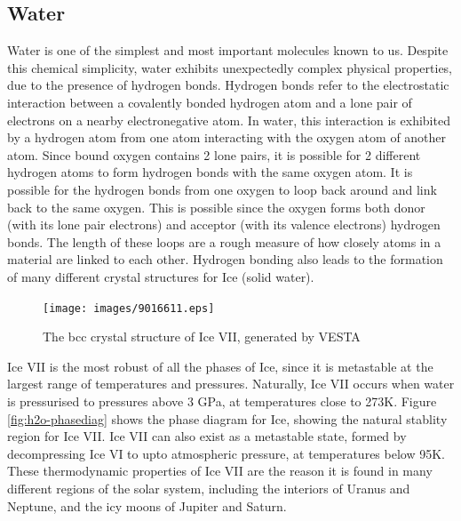 \documentclass[a4paper,11pt]{article}
\begin{document}
\subsection{Water}
Water is one of the simplest and most important molecules known to us. Despite this chemical simplicity, water exhibits unexpectedly complex physical properties, due to the presence of hydrogen bonds. Hydrogen bonds refer to the electrostatic interaction between a covalently bonded hydrogen atom and a lone pair of electrons on a nearby electronegative atom. In water, this interaction is exhibited by a hydrogen atom from one atom interacting with the oxygen atom of another atom. Since bound oxygen contains 2 lone pairs, it is possible for 2 different hydrogen atoms to form hydrogen bonds with the same oxygen atom. It is possible for the hydrogen bonds from one oxygen to loop back around and link back to the same oxygen. This is possible since the oxygen forms both donor (with its lone pair electrons) and acceptor (with its valence electrons) hydrogen bonds. The length of these loops are a rough measure of how closely atoms in a material are linked to each other. Hydrogen bonding also leads to the formation of many different crystal structures for Ice (solid water).
\begin{figure}[H]
  \centering
  \texttt{[image: images/9016611.eps]}
  \caption{The bcc crystal structure of Ice VII, generated by VESTA}
  \label{fig:icevii-bcc}
\end{figure}
Ice VII is the most robust of all the phases of Ice, since it is metastable at the largest range of temperatures and pressures. Naturally, Ice VII occurs when water is pressurised to pressures above 3 GPa, at temperatures close to 273K. Figure \ref{fig:h2o-phasediag} shows the phase diagram for Ice, showing the natural stablity region for Ice VII. Ice VII can also exist as a metastable state, formed by decompressing Ice VI to upto atmospheric pressure, at temperatures below 95K. These thermodynamic properties of Ice VII are the reason it is found in many different regions of the solar system, including the interiors of Uranus and Neptune, and the icy moons of Jupiter and Saturn.
\end{document}
